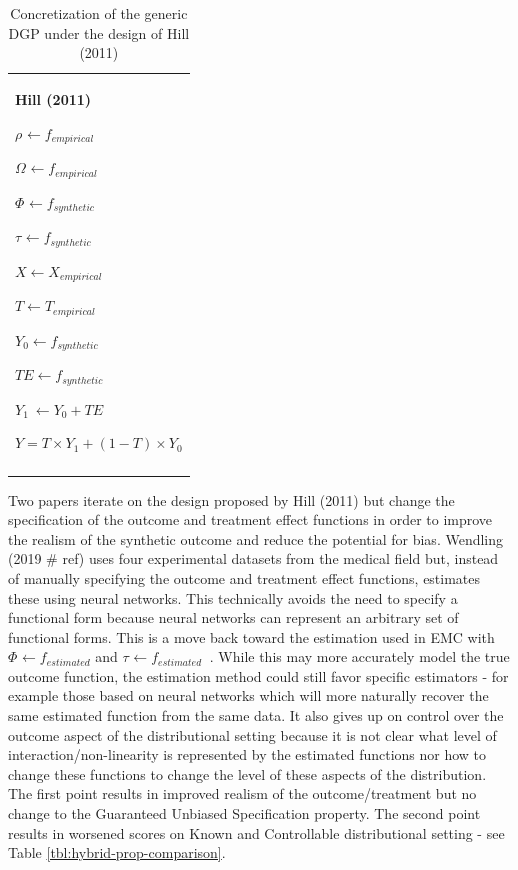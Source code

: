 \documentclass[../main.tex]{subfiles}
\begin{document}
\begin{table}[H]
 			\centering
\begin{tabular}{p{3.14in}}
\hline
\multicolumn{1}{|p{3.14in}|}{\textbf{Hill (2011)} \par  \(  \rho _{} \leftarrow f_{empirical}~ \)  \par  \(  \Omega _{} \leftarrow f_{empirical} \)  \par  \(  \Phi _{} \leftarrow f_{synthetic} \)  \par  \(  \tau_{} \leftarrow f_{synthetic}~ \)  \par  \( X \leftarrow X_{empirical} \)  \par  \( T \leftarrow T_{empirical} \)  \par  \( Y_{0} \leftarrow f_{synthetic} \)  \par  \( TE \leftarrow f_{synthetic} \)  \par  \( Y_{1}~ \leftarrow Y_{0}+ TE \)  \par  \( Y = T \times Y_{1}+  \left( 1-T \right)  \times Y_{0} \)  \par } \\
\hhline{-}

\end{tabular}
\caption{Concretization of the generic DGP under the design of Hill (2011)}
\label{tbl:hill-hybrid}
\end{table}



\vspace{\baselineskip}
Two papers iterate on the design proposed by Hill (2011) but change the specification of the outcome and treatment effect functions in order to improve the realism of the synthetic outcome and reduce the potential for bias. Wendling (2019 $\#$ ref) uses four experimental datasets from the medical field but, instead of manually specifying the outcome and treatment effect functions, estimates these using neural networks. This technically avoids the need to specify a functional form because neural networks can represent an arbitrary set of functional forms. This is a move back toward the estimation used in EMC with  \(  \Phi _{} \leftarrow f_{estimated} \)  and  \(  \tau_{} \leftarrow f_{estimated}~ \) . While this may more accurately model the true outcome function, the estimation method could still favor specific estimators - for example those based on neural networks which will more naturally recover the same estimated function from the same data. It also gives up on control over the outcome aspect of the distributional setting because it is not clear what level of interaction/non-linearity is represented by the estimated functions nor how to change these functions to change the level of these aspects of the distribution. The first point results in improved realism of the outcome/treatment but no change to the Guaranteed Unbiased Specification property. The second point results in worsened scores on Known and Controllable distributional setting - see Table \ref{tbl:hybrid-prop-comparison}.\par
\end{document}
